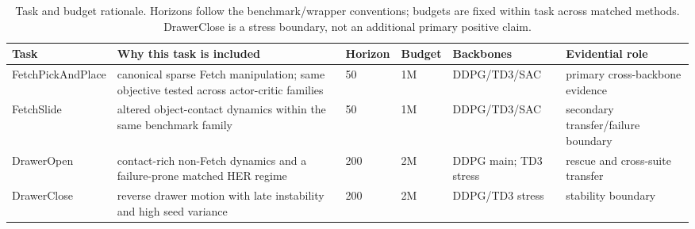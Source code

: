 \documentclass[letterpaper]{article}
\begin{document}
\begin{table}[t]
\centering
\small
\setlength{\tabcolsep}{3pt}
\caption{Task and budget rationale. Horizons follow the benchmark/wrapper conventions; budgets are fixed within task across matched methods. DrawerClose is a stress boundary, not an additional primary positive claim.}
\label{tab:task-design-rationale}
\begin{tabular}{@{}p{}p{}p{}p{}p{}p{}@{}}
\toprule
Task & Why this task is included & Horizon & Budget & Backbones & Evidential role \\
\midrule
FetchPickAndPlace & canonical sparse Fetch manipulation; same objective tested across actor-critic families & 50 & 1M & DDPG/TD3/SAC & primary cross-backbone evidence \\
FetchSlide & altered object-contact dynamics within the same benchmark family & 50 & 1M & DDPG/TD3/SAC & secondary transfer/failure boundary \\
DrawerOpen & contact-rich non-Fetch dynamics and a failure-prone matched HER regime & 200 & 2M & DDPG main; TD3 stress & rescue and cross-suite transfer \\
DrawerClose & reverse drawer motion with late instability and high seed variance & 200 & 2M & DDPG/TD3 stress & stability boundary \\
\bottomrule
\end{tabular}
\end{table}
\end{document}
